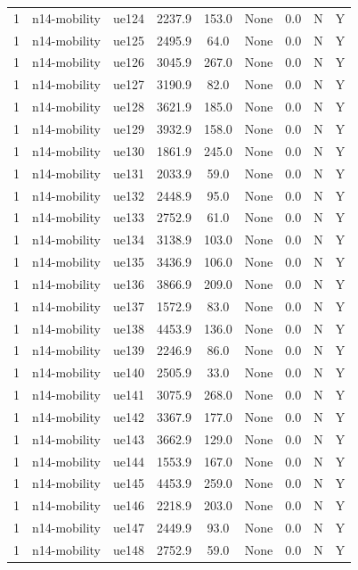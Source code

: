 \begin{table}[ht]
\begin{tabular}{|c|c|c|c|c|c|c|c|c|}
1 & n14-mobility & ue124 & 2237.9 & 153.0 & None & 0.0 & N & Y \\
1 & n14-mobility & ue125 & 2495.9 & 64.0 & None & 0.0 & N & Y \\
1 & n14-mobility & ue126 & 3045.9 & 267.0 & None & 0.0 & N & Y \\
1 & n14-mobility & ue127 & 3190.9 & 82.0 & None & 0.0 & N & Y \\
1 & n14-mobility & ue128 & 3621.9 & 185.0 & None & 0.0 & N & Y \\
1 & n14-mobility & ue129 & 3932.9 & 158.0 & None & 0.0 & N & Y \\
1 & n14-mobility & ue130 & 1861.9 & 245.0 & None & 0.0 & N & Y \\
1 & n14-mobility & ue131 & 2033.9 & 59.0 & None & 0.0 & N & Y \\
1 & n14-mobility & ue132 & 2448.9 & 95.0 & None & 0.0 & N & Y \\
1 & n14-mobility & ue133 & 2752.9 & 61.0 & None & 0.0 & N & Y \\
1 & n14-mobility & ue134 & 3138.9 & 103.0 & None & 0.0 & N & Y \\
1 & n14-mobility & ue135 & 3436.9 & 106.0 & None & 0.0 & N & Y \\
1 & n14-mobility & ue136 & 3866.9 & 209.0 & None & 0.0 & N & Y \\
1 & n14-mobility & ue137 & 1572.9 & 83.0 & None & 0.0 & N & Y \\
1 & n14-mobility & ue138 & 4453.9 & 136.0 & None & 0.0 & N & Y \\
1 & n14-mobility & ue139 & 2246.9 & 86.0 & None & 0.0 & N & Y \\
1 & n14-mobility & ue140 & 2505.9 & 33.0 & None & 0.0 & N & Y \\
1 & n14-mobility & ue141 & 3075.9 & 268.0 & None & 0.0 & N & Y \\
1 & n14-mobility & ue142 & 3367.9 & 177.0 & None & 0.0 & N & Y \\
1 & n14-mobility & ue143 & 3662.9 & 129.0 & None & 0.0 & N & Y \\
1 & n14-mobility & ue144 & 1553.9 & 167.0 & None & 0.0 & N & Y \\
1 & n14-mobility & ue145 & 4453.9 & 259.0 & None & 0.0 & N & Y \\
1 & n14-mobility & ue146 & 2218.9 & 203.0 & None & 0.0 & N & Y \\
1 & n14-mobility & ue147 & 2449.9 & 93.0 & None & 0.0 & N & Y \\
1 & n14-mobility & ue148 & 2752.9 & 59.0 & None & 0.0 & N & Y \\

\end{tabular}
\end{table}
